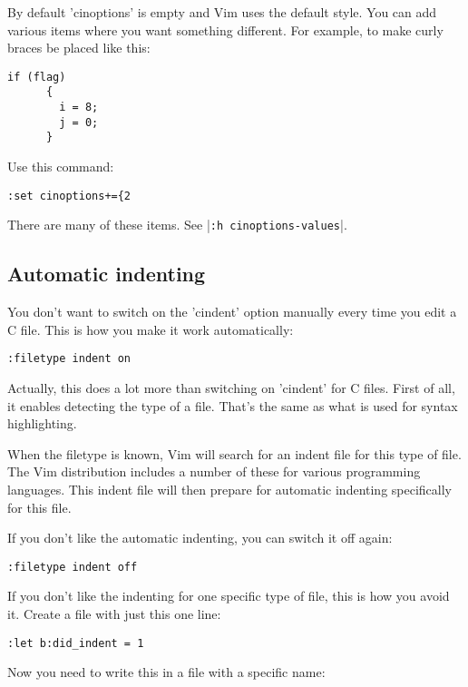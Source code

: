 By default 'cinoptions' is empty and Vim uses the default style.
You can add various items where you want something different.
For example, to make curly braces be placed like this:

\begin{Verbatim}[samepage=true]
    if (flag) 
      { 
        i = 8; 
        j = 0; 
      } 
\end{Verbatim}

Use this command:

\begin{Verbatim}[samepage=true]
 :set cinoptions+={2
\end{Verbatim}

There are many of these items.  See |\verb!:h cinoptions-values!|.
\subsection{Automatic indenting}
You don't want to switch on the 'cindent' option manually every time you edit a C file.
This is how you make it work automatically:

\begin{Verbatim}[samepage=true]
 :filetype indent on
\end{Verbatim}

Actually, this does a lot more than switching on 'cindent' for C files.
First of all, it enables detecting the type of a file.
That's the same as what is used for syntax highlighting.

When the filetype is known, Vim will search for an indent file for this type of file.
The Vim distribution includes a number of these for various programming languages.
This indent file will then prepare for automatic indenting specifically for this file.

If you don't like the automatic indenting, you can switch it off again:

\begin{Verbatim}[samepage=true]
 :filetype indent off
\end{Verbatim}

If you don't like the indenting for one specific type of file, this is how you avoid it.
Create a file with just this one line:

\begin{Verbatim}[samepage=true]
 :let b:did_indent = 1
\end{Verbatim}

Now you need to write this in a file with a specific name:

